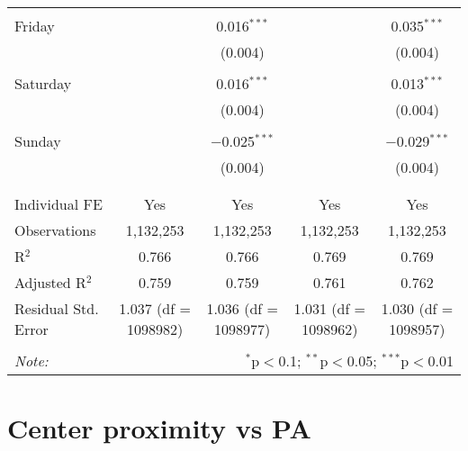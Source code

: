\documentclass[
]{article}
\begin{document}
\begin{table}[!htbp]
{\begin{tabular}{@{\extracolsep{5pt}}lcccc}
  & & & & \\ 
 Friday &  & 0.016$^{***}$ &  & 0.035$^{***}$ \\ 
  &  & (0.004) &  & (0.004) \\ 
  & & & & \\ 
 Saturday &  & 0.016$^{***}$ &  & 0.013$^{***}$ \\ 
  &  & (0.004) &  & (0.004) \\ 
  & & & & \\ 
 Sunday &  & $-$0.025$^{***}$ &  & $-$0.029$^{***}$ \\ 
  &  & (0.004) &  & (0.004) \\ 
  & & & & \\ 
\hline \\[-1.8ex] 
Individual FE & Yes & Yes & Yes & Yes \\ 
Observations & 1,132,253 & 1,132,253 & 1,132,253 & 1,132,253 \\ 
R$^{2}$ & 0.766 & 0.766 & 0.769 & 0.769 \\ 
Adjusted R$^{2}$ & 0.759 & 0.759 & 0.761 & 0.762 \\ 
Residual Std. Error & 1.037 (df = 1098982) & 1.036 (df = 1098977) & 1.031 (df = 1098962) & 1.030 (df = 1098957) \\ 
\hline 
\hline \\[-1.8ex] 
\textit{Note:}  & \multicolumn{4}{r}{$^{*}$p$<$0.1; $^{**}$p$<$0.05; $^{***}$p$<$0.01} \\ 
\end{tabular}
} 
\end{table} 
\newpage
\section{Center proximity vs PA}
\end{document}
